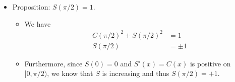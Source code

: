 \documentclass[../notes.tex]{subfiles}
\begin{document}
\begin{itemize}
\begin{itemize}
    \end{itemize}
    \item Proposition: $S(\pi/2)=1$.
    \begin{itemize}
        \item We have
        \begin{align*}
            C(\pi/2)^2+S(\pi/2)^2 &= 1\\
            S(\pi/2) &= \pm 1
        \end{align*}
        \item Furthermore, since $S(0)=0$ and $S'(x)=C(x)$ is positive on $[0,\pi/2)$, we know that $S$ is increasing and thus $S(\pi/2)=+1$.
    \end{itemize}
\end{itemize}
\end{document}
